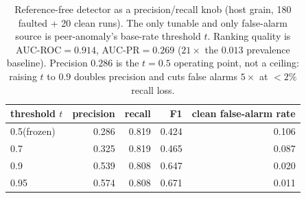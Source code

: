 \begin{table}[t]\centering\small
\caption{Reference-free detector as a precision/recall knob (host grain, 180 faulted + 20 clean runs). The only tunable and only false-alarm source is peer-anomaly's base-rate threshold $t$. Ranking quality is AUC-ROC$=0.914$, AUC-PR$=0.269$ ($21\times$ the $0.013$ prevalence baseline). Precision $0.286$ is the $t\!=\!0.5$ operating point, not a ceiling: raising $t$ to $0.9$ doubles precision and cuts false alarms $5\times$ at $<2\%$ recall loss.}
\label{tab:detector-knob}
\begin{tabular}{lrrrr}\toprule
threshold $t$ & precision & recall & F1 & clean false-alarm rate\\\midrule
0.5\;(frozen) & 0.286 & 0.819 & 0.424 & 0.106\\
0.7 & 0.325 & 0.819 & 0.465 & 0.087\\
0.9 & 0.539 & 0.808 & 0.647 & 0.020\\
0.95 & 0.574 & 0.808 & 0.671 & 0.011\\
\bottomrule\end{tabular}\end{table}
